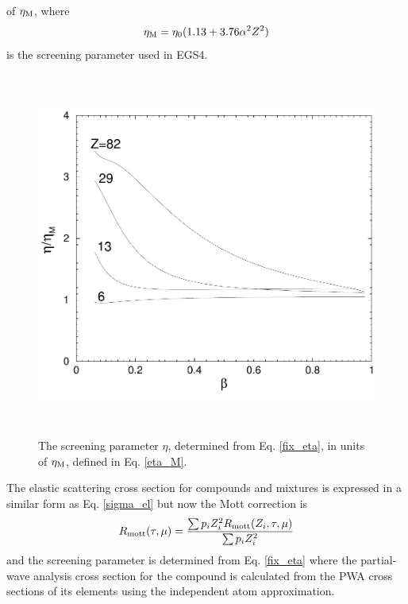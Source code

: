 of $\eta_{\rm M}$, where 
\begin{equation}
\label{eta_M}
\eta_{\rm M} = \eta_0 (1.13 + 3.76 \alpha^2 Z^2)
\end{equation}
is the screening parameter used in EGS4.  
\begin{figure}[htp]
\includegraphics[height=12cm,width=12cm]{figures/eta}
\caption[Screening parameter]{\label{fig_eta} The screening parameter $\eta$,  
determined from Eq. \protect\eqref{fix_eta}, in units of 
$\eta_{\rm M}$, defined in Eq. \protect\eqref{eta_M}.}
\end{figure} 

The elastic scattering cross section for compounds and 
mixtures is expressed in a similar form as Eq. \eqref{sigma_el} 
but now the Mott correction is 
\begin{equation}
R_{\rm mott}(\tau,\mu) = {\sum p_i Z_i^2 R_{\rm mott}(Z_i,\tau,\mu) \over 
\sum p_i Z_i^2}
\end{equation}
and the screening parameter is determined from Eq. \eqref{fix_eta} where 
the partial-wave analysis cross section for the compound is 
calculated from the PWA cross sections of its elements using 
the independent atom approximation. 

